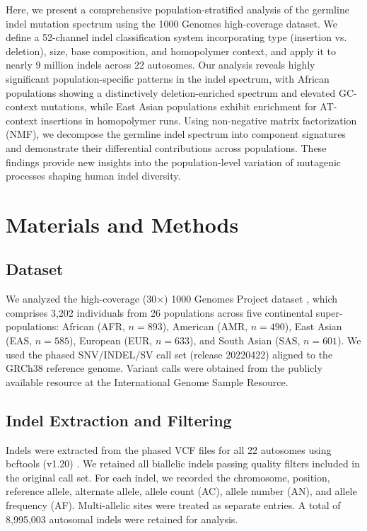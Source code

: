 \documentclass[11pt,a4paper]{article}
\begin{document}
Here, we present a comprehensive population-stratified analysis of the germline indel mutation spectrum using the 1000 Genomes high-coverage dataset. We define a 52-channel indel classification system incorporating type (insertion vs. deletion), size, base composition, and homopolymer context, and apply it to nearly 9 million indels across 22 autosomes. Our analysis reveals highly significant population-specific patterns in the indel spectrum, with African populations showing a distinctively deletion-enriched spectrum and elevated GC-context mutations, while East Asian populations exhibit enrichment for AT-context insertions in homopolymer runs. Using non-negative matrix factorization (NMF), we decompose the germline indel spectrum into component signatures and demonstrate their differential contributions across populations. These findings provide new insights into the population-level variation of mutagenic processes shaping human indel diversity.

\section{Materials and Methods}

\subsection{Dataset}

We analyzed the high-coverage (30$\times$) 1000 Genomes Project dataset \citep{byrska2022high}, which comprises 3,202 individuals from 26 populations across five continental super-populations: African (AFR, $n = 893$), American (AMR, $n = 490$), East Asian (EAS, $n = 585$), European (EUR, $n = 633$), and South Asian (SAS, $n = 601$). We used the phased SNV/INDEL/SV call set (release 20220422) aligned to the GRCh38 reference genome. Variant calls were obtained from the publicly available resource at the International Genome Sample Resource.

\subsection{Indel Extraction and Filtering}

Indels were extracted from the phased VCF files for all 22 autosomes using bcftools (v1.20) \citep{danecek2021twelve}. We retained all biallelic indels passing quality filters included in the original call set. For each indel, we recorded the chromosome, position, reference allele, alternate allele, allele count (AC), allele number (AN), and allele frequency (AF). Multi-allelic sites were treated as separate entries. A total of 8,995,003 autosomal indels were retained for analysis.
\end{document}
